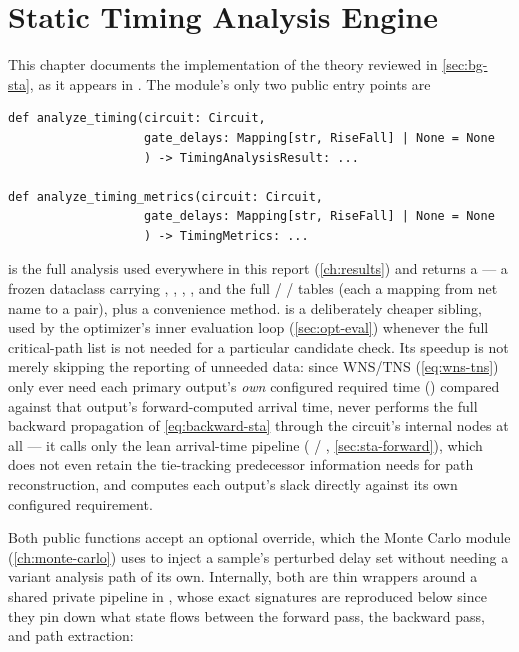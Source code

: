 \chapter{Static Timing Analysis Engine}
\label{ch:sta}

This chapter documents the implementation of the theory reviewed in
\cref{sec:bg-sta}, as it appears in . The module's
only two public entry points are

\begin{lstlisting}[style=pythonstyle, numbers=none]
def analyze_timing(circuit: Circuit,
                   gate_delays: Mapping[str, RiseFall] | None = None
                   ) -> TimingAnalysisResult: ...

def analyze_timing_metrics(circuit: Circuit,
                   gate_delays: Mapping[str, RiseFall] | None = None
                   ) -> TimingMetrics: ...
\end{lstlisting}

 is the full analysis used everywhere in this report
(\cref{ch:results}) and returns a  --- a frozen
dataclass carrying , , ,
, and the full  /
 /  tables (each a mapping
from net name to a  pair), plus a
 convenience method.
 is a deliberately cheaper sibling, used by
the optimizer's inner evaluation loop (\cref{sec:opt-eval}) whenever the
full critical-path list is not needed for a particular candidate check. Its
speedup is not merely skipping the reporting of unneeded data: since
$\mathrm{WNS}$/$\mathrm{TNS}$ (\cref{eq:wns-tns}) only ever need each
primary output's \emph{own} configured required time
() compared against that
output's forward-computed arrival time, 
never performs the full backward propagation of \cref{eq:backward-sta}
through the circuit's internal nodes at all --- it calls only the lean
arrival-time pipeline ( /
, \cref{sec:sta-forward}), which does not
even retain the tie-tracking predecessor information 
needs for path reconstruction, and computes each output's slack directly
against its own configured requirement.

Both public functions accept an optional  override,
which the Monte Carlo module (\cref{ch:monte-carlo}) uses to inject a
sample's perturbed delay set without needing a variant analysis path of its
own. Internally, both are thin wrappers around a shared private pipeline in
, whose exact signatures are reproduced below since
they pin down what state flows between the forward pass, the
backward pass, and path extraction:

